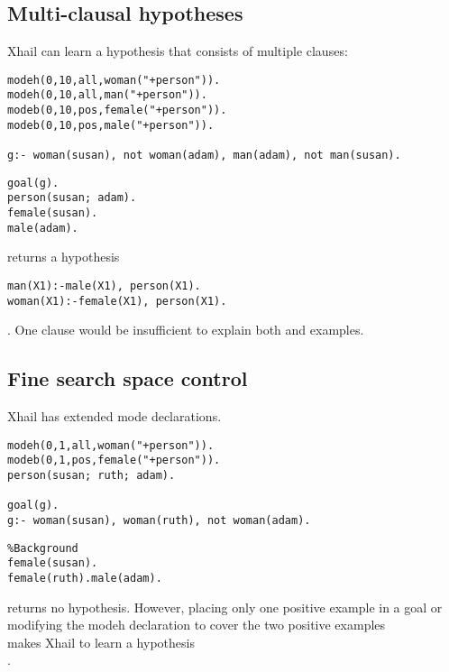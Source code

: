 \subsection{Multi-clausal hypotheses}
Xhail can learn a hypothesis that consists of multiple clauses:

\begin{minipage}[t]{.50\textwidth}
\begin{lstlisting}
modeh(0,10,all,woman("+person")).
modeh(0,10,all,man("+person")).
modeb(0,10,pos,female("+person")).
modeb(0,10,pos,male("+person")).

g:- woman(susan), not woman(adam), man(adam), not man(susan).
\end{lstlisting}
\end{minipage}
\begin{minipage}[t]{.20\textwidth}
\begin{lstlisting}
goal(g).
person(susan; adam).
female(susan).
male(adam).
\end{lstlisting}
\end{minipage}

returns a hypothesis
\begin{lstlisting}
man(X1):-male(X1), person(X1).
woman(X1):-female(X1), person(X1).
\end{lstlisting}.
One clause would be insufficient to explain both  and  examples.

\subsection{Fine search space control}\label{xhail_fine_search_space_control}
Xhail has extended mode declarations.

\begin{minipage}[t]{.50\textwidth}
\begin{lstlisting}
modeh(0,1,all,woman("+person")).
modeb(0,1,pos,female("+person")).
person(susan; ruth; adam).

goal(g).
g:- woman(susan), woman(ruth), not woman(adam).
\end{lstlisting}
\end{minipage}
\begin{minipage}[t]{.20\textwidth}
\begin{lstlisting}
%Background
female(susan).
female(ruth).male(adam).
\end{lstlisting}
\end{minipage}

returns no hypothesis. However, placing only one positive example in a goal
 or modifying the modeh declaration to cover the two positive examples\\
 makes Xhail to learn a hypothesis\\
.

